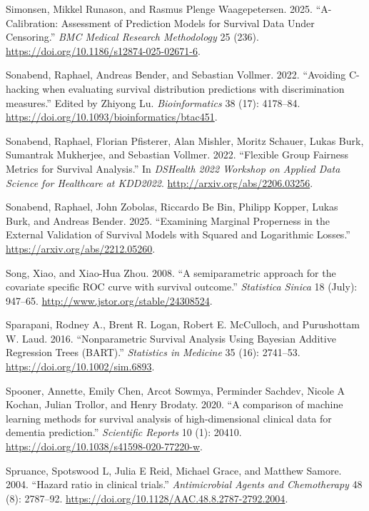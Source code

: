 \documentclass[
  letterpaper,
  krantz2]{style/krantz}
\newlength{\cslhangindent}
\newenvironment{CSLReferences}[2] %
 {\begin{list}{}{%
  \setlength{\itemindent}{0pt}
  \setlength{\leftmargin}{0pt}
  \setlength{\parsep}{0pt}
  \ifodd #1
   \setlength{\leftmargin}{\cslhangindent}
   \setlength{\itemindent}{-1\cslhangindent}
  \fi
  \setlength{\itemsep}{#2\baselineskip}}}
 {\end{list}}
\begin{document}
\begin{CSLReferences}{1}{0}
Simonsen, Mikkel Runason, and Rasmus Plenge Waagepetersen. 2025.
{``A-Calibration: Assessment of Prediction Models for Survival Data
Under Censoring.''} \emph{BMC Medical Research Methodology} 25 (236).
\url{https://doi.org/10.1186/s12874-025-02671-6}.

Sonabend, Raphael, Andreas Bender, and Sebastian Vollmer. 2022.
{``{Avoiding C-hacking when evaluating survival distribution predictions
with discrimination measures}.''} Edited by Zhiyong Lu.
\emph{Bioinformatics} 38 (17): 4178--84.
\url{https://doi.org/10.1093/bioinformatics/btac451}.

Sonabend, Raphael, Florian Pfisterer, Alan Mishler, Moritz Schauer,
Lukas Burk, Sumantrak Mukherjee, and Sebastian Vollmer. 2022.
{``{Flexible Group Fairness Metrics for Survival Analysis}.''} In
\emph{DSHealth 2022 Workshop on Applied Data Science for Healthcare at
KDD2022}. \url{http://arxiv.org/abs/2206.03256}.

Sonabend, Raphael, John Zobolas, Riccardo Be Bin, Philipp Kopper, Lukas
Burk, and Andreas Bender. 2025. {``Examining Marginal Properness in the
External Validation of Survival Models with Squared and Logarithmic
Losses.''} \url{https://arxiv.org/abs/2212.05260}.

Song, Xiao, and Xiao-Hua Zhou. 2008. {``{A semiparametric approach for
the covariate specific ROC curve with survival outcome}.''}
\emph{Statistica Sinica} 18 (July): 947--65.
\url{http://www.jstor.org/stable/24308524}.

Sparapani, Rodney A., Brent R. Logan, Robert E. McCulloch, and
Purushottam W. Laud. 2016. {``Nonparametric Survival Analysis Using
Bayesian Additive Regression Trees (BART).''} \emph{Statistics in
Medicine} 35 (16): 2741--53. \url{https://doi.org/10.1002/sim.6893}.

Spooner, Annette, Emily Chen, Arcot Sowmya, Perminder Sachdev, Nicole A
Kochan, Julian Trollor, and Henry Brodaty. 2020. {``{A comparison of
machine learning methods for survival analysis of high-dimensional
clinical data for dementia prediction}.''} \emph{Scientific Reports} 10
(1): 20410. \url{https://doi.org/10.1038/s41598-020-77220-w}.

Spruance, Spotswood L, Julia E Reid, Michael Grace, and Matthew Samore.
2004. {``{Hazard ratio in clinical trials}.''} \emph{Antimicrobial
Agents and Chemotherapy} 48 (8): 2787--92.
\url{https://doi.org/10.1128/AAC.48.8.2787-2792.2004}.


\end{CSLReferences}
\end{document}
